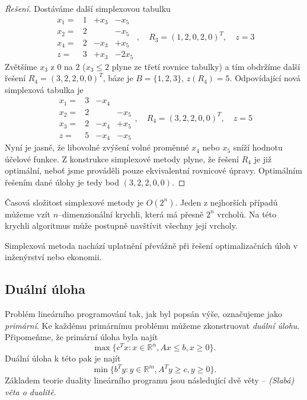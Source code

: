 \begin{proof}[Řešení]
Dostáváme další simplexovou tabulku
\[
\begin{array}{c|ccc}
x_1=& 1 & +x_3 & -x_5   \\
x_2=& 2 &  &  -x_5       \\
x_4=& 2 & -x_3& +x_5        \\
\hline
z=& 3& +x_3 & -2x_5
\end{array}, \quad R_3=(1,2,0,2,0)^T, \quad z=3
\]
Zvětšíme $x_3$ z $0$ na $2$ ($x_3\leq 2$ plyne ze třetí rovnice tabulky) a tím obdržíme
další řešení $R_4=(3,2,2,0,0)^T$, báze je $B=\{1,2,3\}$, $z(R_4)=5$. Odpovídající nová
simplexová tabulka je
\[
\begin{array}{c|ccc}
x_1=& 3 & -x_4 &    \\
x_2=& 2 &  &  -x_5       \\
x_3=& 2 & -x_4& +x_5        \\
\hline
z=& 5& -x_4 & -x_5
\end{array}, \quad R_4=(3,2,2,0,0)^T, \quad z=5
\]
Nyní je jasné, že libovolné zvýšení volné proměnné $x_4$ nebo $x_5$ sníží hodnotu účelové funkce.
Z konstrukce simplexové metody plyne, že řešení $R_4$ je již optimální, neboť jsme prováděli pouze
ekvivalentní rovnicové úpravy. Optimálním řešením dané úlohy je tedy bod $(3,2,2,0,0)$.



\end{proof}




Časová složitost simplexové metody je $O(2^n)$.
Jeden z nejhorších případů můžeme vzít $n$--dimenzionální krychli,
která má přesně $2^n$ vrcholů. Na této krychli algoritmus
může postupně navštívit všechny její vrcholy. 

Simplexová metoda nachází uplatnění převážně při řešení optimalizačních úloh v inženýrství nebo ekonomii.

\subsection{Duální úloha}

Problém lineárního programování tak, jak byl popsán výše, označujeme jako {\it primární}.
Ke každému primárnímu problému můžeme zkonstruovat {\it duální úlohu}. Připomeňme, že
primární úloha byla najít
\[
\max\{ c^Tx : x\in\mathbb{R}^n, Ax\leq b, x\geq 0 \}.
\]
Duální úloha k této pak je najít
\[
\min\{ b^Ty : y\in\mathbb{R}^m, A^Ty\geq c, y\geq 0 \}.
\]
Základem teorie duality lineárního programu jsou následující dvě věty -- {\it (Slabá) věta o dualitě}.

